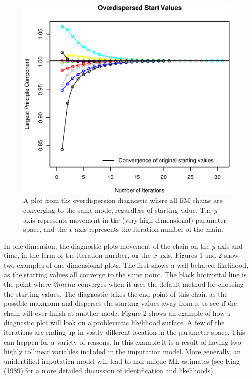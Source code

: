\documentclass[12pt,titlepage]{article}
\newcommand{\Amelia}{\ensuremath{\mathfrak Amelia} }
\begin{document}
\begin{figure}[ht]
  \centering
  \includegraphics[scale=.7]{overdis1d.eps}
  \caption{A plot from the overdispersion diagnostic where all EM chains are converging to the same mode, regardless of starting value.  The $y$-axis represents movement in the (very high dimensional) parameter space, and the $x$-axis represents the iteration number of the chain.}
\end{figure}

In one dimension, the diagnostic plots movement of the chain on the $y$-axis and time, in the form of the iteration number, on the $x$-axis.  Figures 1 and 2 show two examples of one dimensional plots.  The first shows a well behaved likelihood, as the starting values all converge to the same point.  The black horizontal line is the point where \Amelia converges when it uses the default method for choosing the starting values.  The diagnostic takes the end point of this chain as the possible maximum and disperses the starting values away from it to see if the chain will ever finish at another mode.  Figure 2 shows an example of how a diagnostic plot will look on a problematic likelihood surface.  A few of the iterations are ending up in vastly different location in the parameter space.  This can happen for a variety of reasons.  In this example it is a result of having two highly collinear variables included in the imputation model.  More generally, an unidentified imputation model will lead to non-unique ML estimates (see King (1989) for a more detailed discussion of identification and likelihoods).  
\end{document}
